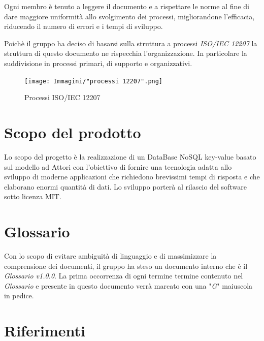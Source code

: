 \documentclass[a4paper]{report}
\begin{document}
		Ogni membro è tenuto a leggere il documento e a rispettare le norme al fine di dare maggiore uniformità 
		allo svolgimento dei processi, 
		migliorandone l'efficacia, riducendo il numero di errori e i tempi di sviluppo.
		
		Poichè il gruppo ha deciso di basarsi sulla struttura a processi \emph{ISO/IEC 12207} 
		la struttura di questo documento ne rispecchia 
		l'organizzazione. In particolare la suddivisione in processi primari, di supporto e organizzativi.
		\begin{figure}[H]
			\centering
			\texttt{[image: Immagini/"processi 12207".png]}
			\caption{Processi ISO/IEC 12207}
		\end{figure}
	\section{Scopo del prodotto}
		Lo scopo del progetto è la realizzazione di un DataBase NoSQL key-value basato sul modello ad 
		Attori con l'obiettivo di fornire una tecnologia adatta allo sviluppo di moderne 
		applicazioni che richiedono brevissimi tempi di risposta e che elaborano enormi quantità 
		di dati. Lo sviluppo porterà al rilascio del software sotto licenza MIT.
	\section{Glossario}
		Con lo scopo di evitare ambiguità di linguaggio e di massimizzare la comprensione dei documenti, il 
		gruppo ha steso un documento interno che è il \emph{Glossario v1.0.0}. La prima occorrenza
		di ogni termine termine contenuto nel \emph{Glossario} e presente in questo documento verrà 
		marcato con una "\textit{G}" maiuscola in pedice.
	\section{Riferimenti}
\end{document}

